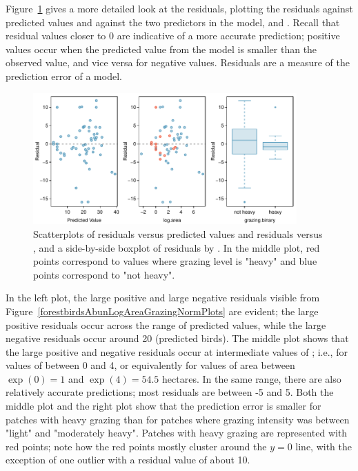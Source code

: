 Figure~\ref{forestbirdsAbunLogAreaGrazingResidPlots} gives a more detailed look at the residuals, plotting the residuals against predicted values and against the two predictors in the model,  and . Recall that residual values closer to 0 are indicative of a more accurate prediction; positive values occur when the predicted value from the model is smaller than the observed value, and vice versa for negative values. Residuals are a measure of the prediction error of a model.

\begin{figure}[h!]
	\centering
	\includegraphics[width=0.9\textwidth]
	{ch_multiple_linear_regression_oi_biostat/figures/forestbirdsAbunLogAreaGrazingResidPlots/forestbirdsAbunLogAreaGrazingResidPlots.pdf}
	\caption{Scatterplots of residuals versus predicted values and residuals versus , and a side-by-side boxplot of residuals by . In the middle plot, red points correspond to values where grazing level is "heavy" and blue points correspond to "not heavy".}
	\label{forestbirdsAbunLogAreaGrazingResidPlots}
\end{figure}

In the left plot, the large positive and large negative residuals visible from Figure~\ref{forestbirdsAbunLogAreaGrazingNormPlots} are evident; the large positive residuals occur across the range of predicted values, while the large negative residuals occur around 20 (predicted birds). The middle plot shows that the large positive and negative residuals occur at intermediate values of ; i.e., for values of  between 0 and 4, or equivalently for values of area between $\exp(0) = 1$ and $\exp(4) = 54.5$ hectares. In the same range, there are also relatively accurate predictions; most residuals are between -5 and 5. Both the middle plot and the right plot show that the prediction error is smaller for patches with heavy grazing than for patches where grazing intensity was between "light" and "moderately heavy". Patches with heavy grazing are represented with red points; note how the red points mostly cluster around the $y = 0$ line, with the exception of one outlier with a residual value of about 10.

